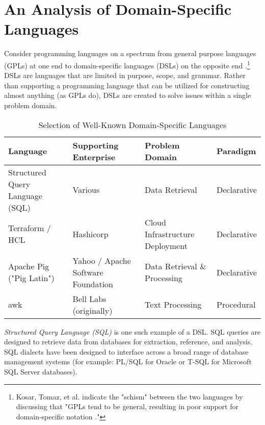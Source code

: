 \section{An Analysis of Domain-Specific Languages}

Consider programming languages on a spectrum from general purpose languages (GPLs) at one end to domain-specific languages (DSLs) on the opposite end \cite{tomaz-dsl}.\footnote{Kosar, Tomaz, et al. indicate the "schism" between the two languages by discussing that "GPLs tend to be general, resulting in
poor support for domain-specific notation \cite{tomaz-dsl}."}
DSLs are languages that are limited in purpose, scope, and grammar. Rather than supporting a programming language that can be utilized for constructing almost anything (as GPLs do), DSLs are created to solve issues within a single problem domain.

\begin{table}[ht]
    \centering
        \begin{tabular}{|p{6cm}|p{4cm}|p{4cm}|p{2cm}|}
        \hline
        \textbf{Language} & \textbf{Supporting \newline Enterprise} & \textbf{Problem Domain} & \textbf{Paradigm} \\
        \hline
        Structured Query Language (SQL) & Various & Data Retrieval & Declarative \\
        \hline
        Terraform / HCL & Hashicorp & Cloud Infrastructure \newline Deployment & Declarative \\
        \hline
        Apache Pig ("Pig Latin") & Yahoo / Apache \newline Software Foundation & Data Retrieval \newline \& Processing & Declarative \\
        \hline
        awk & Bell Labs (originally) & Text Processing & Procedural \\
        \hline
        \end{tabular}
    \caption{Selection of Well-Known Domain-Specific Languages}
    \label{tab:well-known-dsl}
\end{table}

\textit{Structured Query Language (SQL)} \cite{dsl-aws} is one such example of a DSL. SQL queries are designed to retrieve data from databases for extraction, reference, and analysis. SQL dialects have been designed to interface across a broad range of database management systems (for example: PL/SQL for Oracle or T-SQL for Microsoft SQL Server databases).

